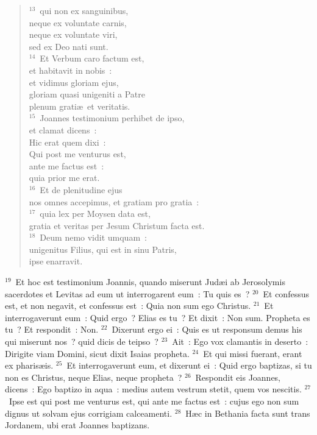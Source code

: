 \begin{flushleft}
\begin{verse}
${}^{13}$~qui non ex sanguinibus,\\ neque ex voluntate carnis,\\ neque ex voluntate viri,\\ sed ex Deo nati sunt.\\
${}^{14}$~Et Verbum caro factum est,\\ et habitavit in nobis~:\\ et vidimus gloriam ejus,\\ gloriam quasi unigeniti a Patre\\ plenum grati\ae\ et veritatis.\\
${}^{15}$~Joannes testimonium perhibet de ipso,\\ et clamat dicens~:\\ Hic erat quem dixi~:\\ Qui post me venturus est,\\ ante me factus est~:\\ quia prior me erat.\\
${}^{16}$~Et de plenitudine ejus\\ nos omnes accepimus, et gratiam pro gratia~:\\
${}^{17}$~quia lex per Moysen data est,\\ gratia et veritas per Jesum Christum facta est.\\
${}^{18}$~Deum nemo vidit umquam~:\\ unigenitus Filius, qui est in sinu Patris,\\ ipse enarravit.\end{verse}\end{flushleft}


${}^{19}$~Et hoc est testimonium Joannis, quando miserunt Jud\ae i ab Jerosolymis sacerdotes et Levitas ad eum ut interrogarent eum~: Tu quis es~?
${}^{20}$~Et confessus est, et non negavit, et confessus est~: Quia non sum ego Christus.
${}^{21}$~Et interrogaverunt eum~: Quid ergo~? Elias es tu~? Et dixit~: Non sum. Propheta es tu~? Et respondit~: Non.
${}^{22}$~Dixerunt ergo ei~: Quis es ut responsum demus his qui miserunt nos~? quid dicis de teipso~?
${}^{23}$~Ait~: Ego vox clamantis in deserto~: Dirigite viam Domini, sicut dixit Isaias propheta.
${}^{24}$~Et qui missi fuerant, erant ex pharis\ae is.
${}^{25}$~Et interrogaverunt eum, et dixerunt ei~: Quid ergo baptizas, si tu non es Christus, neque Elias, neque propheta~?
${}^{26}$~Respondit eis Joannes, dicens~: Ego baptizo in aqua~: medius autem vestrum stetit, quem vos nescitis.
${}^{27}$~Ipse est qui post me venturus est, qui ante me factus est~: cujus ego non sum dignus ut solvam ejus corrigiam calceamenti.
${}^{28}$~H\ae c in Bethania facta sunt trans Jordanem, ubi erat Joannes baptizans.


